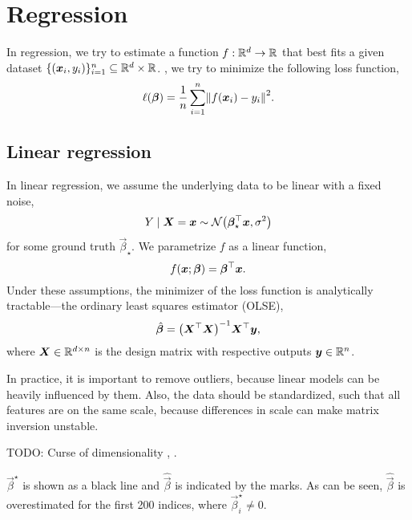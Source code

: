 \section{Regression}

In regression, we try to estimate a function $f: \mathbb{R}^d \to \mathbb{R}$ that best fits a given dataset $\{
    (\bm{x}_i, y_i) \}_{i=1}^n \subseteq \mathbb{R}^d \times \mathbb{R}$. \Ie, we try to minimize the following loss
function, \[
    \ell(\vec{\beta}) = \frac{1}{n} \sum_{i=1}^{n} \lft\| f(\vec{x}_i) - y_i \rgt\|^2.
\]

\subsection{Linear regression}

In linear regression, we assume the underlying data to be linear with a fixed noise, \[
    Y \mid \vec{X} = \vec{x} \sim \mathcal{N} \lft( \transpose{\vec{\beta}_\star} \vec{x}, \sigma^2 \rgt)
\]
for some ground truth $\vec{\beta}_\star$. We parametrize $f$ as a linear function, \[
    f(\bm{x}; \bm{\beta}) = \bm{\beta}^\top \bm{x}.
\]
Under these assumptions, the minimizer of the loss function is analytically tractable---the
ordinary least squares estimator (OLSE), \[
    \hat{\vec{\beta}} = \inv{\lft( \transpose{\mat{X}} \mat{X} \rgt)} \transpose{\mat{X}} \vec{y},
\]
where $\bm{X} \in \mathbb{R}^{d \times n}$ is the design matrix with respective outputs $\bm{y} \in
    \mathbb{R}^n$.

In practice, it is important to remove outliers, because linear models can be heavily influenced by
them. Also, the data should be standardized, such that all features are on the same scale, because
differences in scale can make matrix inversion unstable.

TODO: Curse of dimensionality \citep{sur2019modern}, .

\begin{marginfigure}
    \caption{$\vec{\beta}^\star$ is shown as a black line and $\hat{\vec{\beta}}$ is indicated by the marks. As can be seen, $\hat{\vec{\beta}}$ is overestimated for the first 200 indices, where $\vec{\beta}^\star_i \neq 0$.}
    \label{fig:overestimation}
\end{marginfigure}

